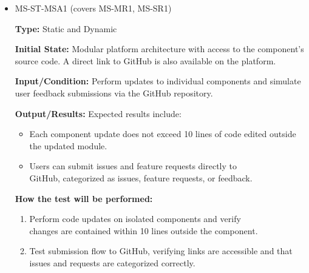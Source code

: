 \documentclass[12pt, titlepage]{article}
\begin{document}
\begin{itemize} 
  \item MS-ST-MSA1 (covers MS-MR1, MS-SR1)
  \begin{mdframed}[linewidth=0.5mm] 
    \textbf{Type:} Static and Dynamic \par 
    \textbf{Initial State:} Modular platform architecture with access to the component’s source code. A direct link to GitHub is also available on the platform. \par 
    \textbf{Input/Condition:} Perform updates to individual components and simulate user feedback submissions via the GitHub repository. \par 
    \textbf{Output/Results:} Expected results include: \begin{itemize} \item Each component update does not exceed 10 lines of code edited outside the updated module. 
      \item Users can submit issues and feature requests directly to \\GitHub, categorized as issues, feature requests, or feedback. 
    \end{itemize} \par 
    \textbf{How the test will be performed:} 
    \begin{enumerate}[noitemsep] 
      \item Perform code updates on isolated components and verify \\changes are contained within 10 lines outside the component. 
      \item Test submission flow to GitHub, verifying links are accessible and that issues and requests are categorized correctly. 
    \end{enumerate} 
  \end{mdframed}


\end{itemize}
\end{document}
